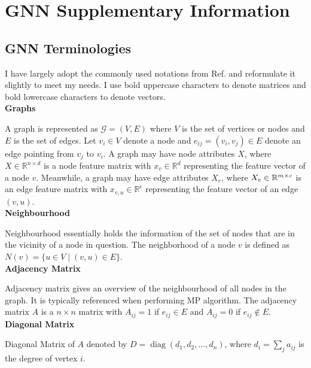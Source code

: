 \documentclass{report} %
\begin{document}
\section{GNN Supplementary Information}
\label{sec:GNN Supplementary Information}

\subsection{GNN Terminologies}
\label{subsec:GNN Terminologies}

I have largely adopt the commonly used notations from Ref. \cite{GNN-2019} and reformulate it slightly to meet my needs.
I use bold uppercase characters to denote matrices and bold lowercase characters to denote vectors.\\

\textbf{Graphs}

A graph is represented as \( \mathcal{G} = (V, E) \) where \( V \) is the set of vertices or nodes  and \( E \) is the set of edges. 
Let \( v_i \in V \) denote a node and \( e_{ij} = (v_i, v_j) \in E \) denote an edge pointing from \( v_j \) to \( v_i \).
A graph may have node attributes \( X \), where \( X \in \mathbb{R}^{n \times d} \) is a node feature matrix with 
\( x_v \in \mathbb{R}^d \) representing the feature vector of a node \( v \). 
Meanwhile, a graph may have edge attributes \( X_e \), where \( X_e \in \mathbb{R}^{m \times \\c} \) is an edge
feature matrix with \( x_{v,u} \in \mathbb{R}^c \) representing the feature vector of an edge \( (v, u) \).\\

\textbf{Neighbourhood}

Neighbourhood essentially holds the information of the set of nodes that are in the vicinity of a node in question.
The neighborhood of a node \( v \) is defined as \( N(v) = \{ u \in V \mid (v, u) \in E \} \).\\

\textbf{Adjacency Matrix}

Adjacency matrix gives an overview of the neighbourhood of all nodes in the graph. It is typically referenced when performing \ac{MP} algorithm.
The adjacency matrix \( A \) is a \( n \times n \) matrix with \( A_{ij} = 1 \) if \( e_{ij} \in E \) and \( A_{ij} = 0 \) if \( e_{ij} \notin E \).\\

\textbf{Diagonal Matrix} 

Diagonal Matrix of \( A \) denoted by  \( D = \operatorname{diag}(d_1, d_2, \dots, d_n) \), where \( d_i = \sum_{j} a_{ij} \) is the degree of vertex \( i \).\\
\end{document}
